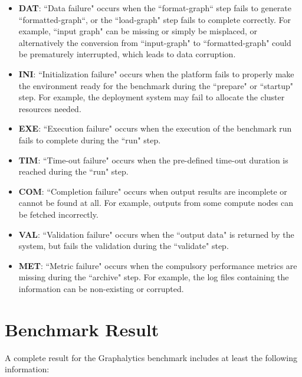 \begin{itemize}
    \item \textbf{DAT}: ``Data failure" occurs when the ``format-graph`` step fails to generate ``formatted-graph``, or the ``load-graph" step fails to complete correctly. For example, ``input graph" can be missing or simply be misplaced, or alternatively the conversion from ``input-graph" to ``formatted-graph" could be prematurely interrupted, which leads to data corruption.
    
    \item \textbf{INI}: ``Initialization failure" occurs when the platform fails to properly make the environment ready for the benchmark during the ``prepare" or ``startup" step. For example, the deployment system may fail to allocate the cluster resources needed.
    
    \item \textbf{EXE}: ``Execution failure" occurs when the execution of the benchmark run fails to complete during the ``run" step.
    
    \item \textbf{TIM}: ``Time-out failure" occurs when the pre-defined time-out duration is reached during the ``run" step.

    \item \textbf{COM}: ``Completion failure" occurs when output results are incomplete or cannot be found at all. For example, outputs from some compute nodes can be fetched incorrectly.
    
    \item \textbf{VAL}: ``Validation failure" occurs when the ``output data" is returned by the system, but fails the validation during the ``validate" step.
    
    \item \textbf{MET}: ``Metric failure" occurs when the compulsory performance metrics are missing during the ``archive" step. For example, the log files containing the information can be non-existing or corrupted.
\end{itemize}










\section{Benchmark Result}

 A complete result for the Graphalytics benchmark includes at least the following information: 

